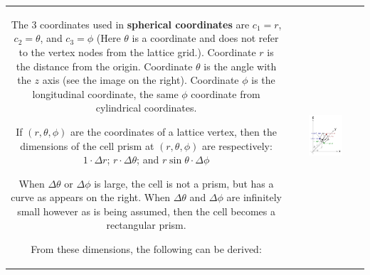 \begin{tabular}{cc}
\parbox{0.5\textwidth}{
The 3 coordinates used in {\bf spherical coordinates} are \(c_1 = r\), \(c_2 = \theta\), and \(c_3 = \phi\) (Here \(\theta\) is a coordinate and does not refer to the vertex nodes from the lattice grid.). Coordinate \(r\) is the distance from the origin. Coordinate \(\theta\) is the angle with the \(z\) axis (see the image on the right). Coordinate \(\phi\) is the longitudinal coordinate, the same \(\phi\) coordinate from cylindrical coordinates.

If \((r, \theta, \phi)\) are the coordinates of a lattice vertex, then the dimensions of the cell prism at \((r,\theta,\phi)\) are respectively:
\(1 \cdot \Delta r\); \(r \cdot \Delta\theta\); and \(r\sin\theta \cdot \Delta\phi\)

When \(\Delta\theta\) or \(\Delta\phi\) is large, the cell is not a prism, but has a curve as appears on the right. When \(\Delta\theta\) and \(\Delta\phi\) are infinitely small however as is being assumed, then the cell becomes a rectangular prism.

From these dimensions, the following can be derived:
} & \parbox{0.5\textwidth}{
\includegraphics[width = 0.5\textwidth]{Coordinate_systems/spherical_coordinates}
}
\end{tabular}

